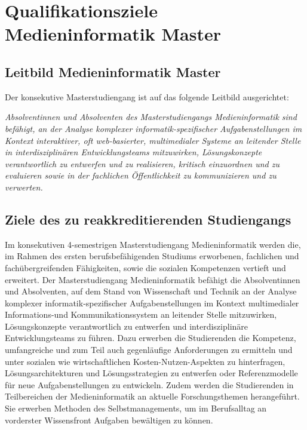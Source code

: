 \section{Qualifikationsziele Medieninformatik
Master\label{/mi-2017/selbstbericht/0200-qualifikationsziele/0000-qualifikationsziele}}\label{qualifikationsziele-medieninformatik-masterpathlabelmi-2017selbstbericht0200-qualifikationsziele0000-qualifikationsziele}

\subsection{Leitbild Medieninformatik
Master\label{/mi-2017/selbstbericht/0200-qualifikationsziele/0000-qualifikationsziele}}\label{leitbild-medieninformatik-masterpathlabelmi-2017selbstbericht0200-qualifikationsziele0000-qualifikationsziele}

Der konsekutive Masterstudiengang ist auf das folgende Leitbild
ausgerichtet:

\emph{Absolventinnen und Absolventen des Masterstudiengangs
Medieninformatik sind befähigt, an der Analyse komplexer
informatik-spezifischer Aufgabenstellungen im Kontext interaktiver, oft
web-basierter, multimedialer Systeme an leitender Stelle in
interdisziplinären Entwicklungsteams mitzuwirken, Lösungskonzepte
verantwortlich zu entwerfen und zu realisieren, kritisch einzuordnen und
zu evaluieren sowie in der fachlichen Öffentlichkeit zu kommunizieren
und zu verwerten.}

\subsection{Ziele des zu reakkreditierenden Studiengangs
\label{/mi-2017/selbstbericht/0200-qualifikationsziele/0000-qualifikationsziele}}\label{ziele-des-zu-reakkreditierenden-studiengangs-pathlabelmi-2017selbstbericht0200-qualifikationsziele0000-qualifikationsziele}

Im konsekutiven 4-semestrigen Masterstudiengang Medieninformatik werden
die, im Rahmen des ersten berufsbefähigenden Studiums erworbenen,
fachlichen und fachübergreifenden Fähigkeiten, sowie die sozialen
Kompetenzen vertieft und erweitert. Der Masterstudiengang
Medieninformatik befähigt die Absolventinnen und Absolventen, auf dem
Stand von Wissenschaft und Technik an der Analyse komplexer
informatik-spezifischer Aufgabenstellungen im Kontext multimedialer
Informations-und Kommunikationssystem an leitender Stelle mitzuwirken,
Lösungskonzepte verantwortlich zu entwerfen und interdisziplinäre
Entwicklungsteams zu führen. Dazu erwerben die Studierenden die
Kompetenz, umfangreiche und zum Teil auch gegenläufige Anforderungen zu
ermitteln und unter sozialen wie wirtschaftlichen Kosten-Nutzen-Aspekten
zu hinterfragen, Lösungsarchitekturen und Lösungsstrategien zu entwerfen
oder Referenzmodelle für neue Aufgabenstellungen zu entwickeln. Zudem
werden die Studierenden in Teilbereichen der Medieninformatik an
aktuelle Forschungsthemen herangeführt. Sie erwerben Methoden des
Selbstmanagements, um im Berufsalltag an vorderster Wissensfront
Aufgaben bewältigen zu können.


